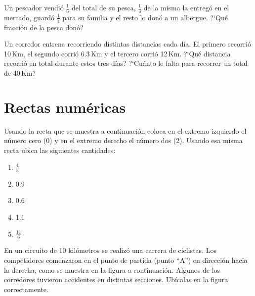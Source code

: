 \documentclass[11pt]{article}
\begin{document}
Un pescador vendi\'o $\frac{1}{6}$ del total de su pesca, $\frac{1}{3}$ 
de la misma la entreg\'o en el mercado, guard\'o $\frac{1}{4}$ para su familia y
el resto lo don\'o a un albergue. ?`Qu\'e fracci\'on de la pesca don\'o?

\vspace{1cm}

Un corredor entrena recorriendo distintas distancias cada d\'ia. El primero
recorri\'o 10\,Km, el segundo corri\'o 6.3\,Km y el tercero corri\'o 12\,Km.
?`Qu\'e distancia recorri\'o en total durante estos tres d\'ias? ?`Cu\'anto le
falta para recorrer un total de 40\,Km?

\vspace{1cm}

\section{Rectas num\'ericas}

Usando la recta que se muestra a continuaci\'on coloca en el extremo izquierdo
el n\'umero cero (0) y en el extremo derecho el n\'umero dos (2). Usando esa
misma recta ubica las siguientes cantidades:
\begin{multicols}{5}
\begin{enumerate}[label=\alph*)] \itemsep-.3em
\item $\displaystyle\frac{4}{5} $ \hspace{5mm} 
\item 0.9 
\item 0.6 
\item 1.1
\item $\displaystyle\frac{11}{6} $
\end{enumerate}
\end{multicols}

\vspace{5mm}

\begin{centering}


\end{centering}

\vspace{5mm}

En un circuito de 10 kil\'ometros se realiz\'o una carrera de ciclistas. Los
competidores comenzaron en el punto de partida (punto ``A'') en direcci\'on
hacia la derecha, como se muestra en la figura a continuaci\'on. Algunos de los
corredores tuvieron accidentes en distintas secciones. Ub\'icalas en la figura
correctamente.
\end{document}
